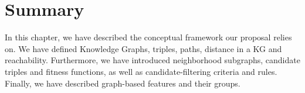 \section{Summary}\label{sec:theo-conclusion}
In this chapter, we have described the conceptual framework our proposal relies on. We have defined Knowledge Graphs, triples, paths, distance in a KG and reachability. Furthermore, we have introduced neighborhood subgraphs, candidate triples and fitness functions, as well as candidate-filtering criteria and rules. Finally, we have described graph-based features and their groups.